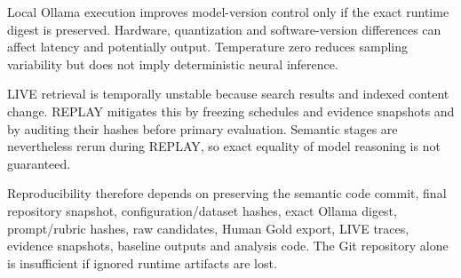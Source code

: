 Local Ollama execution improves model-version control only if the exact runtime digest is preserved. Hardware, quantization and software-version differences can affect latency and potentially output. Temperature zero reduces sampling variability but does not imply deterministic neural inference.

LIVE retrieval is temporally unstable because search results and indexed content change. REPLAY mitigates this by freezing schedules and evidence snapshots and by auditing their hashes before primary evaluation. Semantic stages are nevertheless rerun during REPLAY, so exact equality of model reasoning is not guaranteed.

Reproducibility therefore depends on preserving the semantic code commit, final repository snapshot, configuration/dataset hashes, exact Ollama digest, prompt/rubric hashes, raw candidates, Human Gold export, LIVE traces, evidence snapshots, baseline outputs and analysis code. The Git repository alone is insufficient if ignored runtime artifacts are lost.
